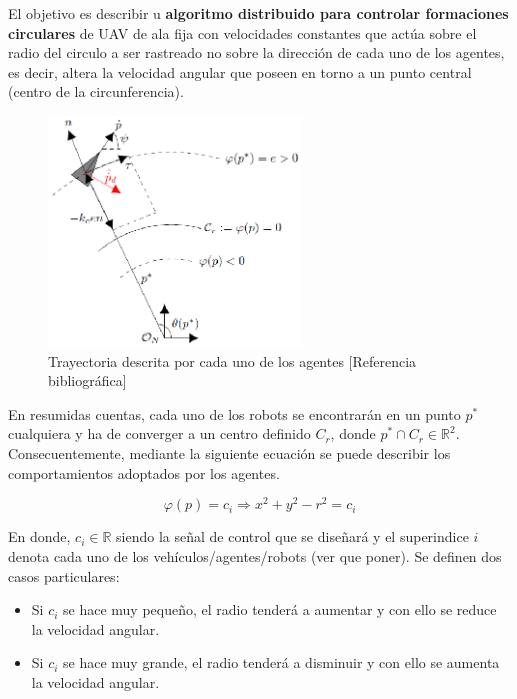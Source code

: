 El objetivo es describir u  \textbf{algoritmo distribuido para controlar formaciones circulares} de UAV de ala fija con velocidades constantes que actúa sobre el radio del circulo a ser rastreado no sobre la dirección de cada uno de los agentes, es decir, altera la velocidad angular que poseen en torno a un punto central (centro de la circunferencia).\\

\begin{figure}[htb]
\centering
\includegraphics[width=0.6\textwidth]{figures/TA.eps}
\caption{Trayectoria descrita por cada uno de los agentes [Referencia bibliográfica]} \label{fig:Trayectory}
\end{figure}

En resumidas cuentas, cada uno de los robots se encontrarán en un punto $p^*$ cualquiera y ha de converger a un centro definido $C_r$, donde $p^* \cap {C}_r \in \mathbb{R}^{2}$. Consecuentemente, mediante la siguiente ecuación se puede describir los comportamientos adoptados por los agentes.

\begin{equation}\label{Control}
	\varphi\left(p\right)=c_i \Longrightarrow x^2+y^2 - r^2 = c_i
\end{equation}

En donde, $c_i \in \mathbb{R}$ siendo la señal de control que se diseñará y el superindice $i$ denota cada uno de los vehículos/agentes/robots (ver que poner). Se definen dos casos particulares:

\begin{itemize}
	\item Si $c_i$ se hace muy pequeño, el radio tenderá a aumentar y con ello se reduce la velocidad angular.
	\item Si $c_i$ se hace muy grande, el radio tenderá a disminuir y con ello se aumenta la velocidad angular.
\end{itemize}

